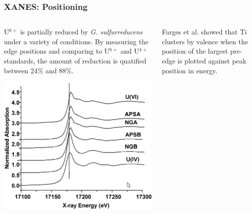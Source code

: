 \documentclass[10pt, xcolor=x11names, compress]{beamer}
\begin{document}
\begin{frame}
  \frametitle{XANES: Positioning}
  \begin{columns}[T]
    \begin{column}{0.5\linewidth}
      \small%
      U$^{6+}$ is partially reduced by \textit{G. sulfurreducens}
      under a variety of conditions.  By measuring the edge positions
      and comparing to U$^{6+}$ and U$^{4+}$ standards,
      the amount of reduction is quatified between 24\% and 88\%.

      \includegraphics[width=0.8\linewidth]{images/u46.png}      
    \end{column}
    \begin{column}{0.5\linewidth}
      \small%
      Farges et al. showed that Ti clusters by valence when the
      position of the largest {\color{red}pre-edge} is plotted against
      peak position in energy.


\end{column}
\end{columns}
\end{frame}
\end{document}
